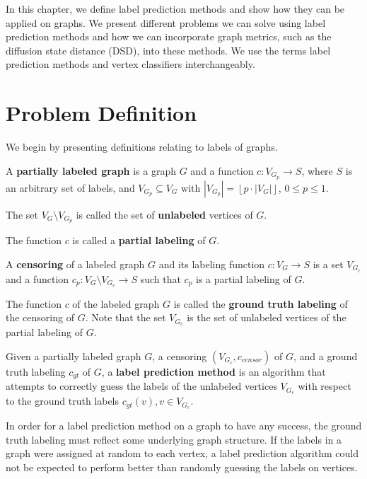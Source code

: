 In this chapter, we define label prediction methods and show how they can
be applied on graphs. We present different problems we can solve using
label prediction methods and how we can incorporate graph metrics, such as
the diffusion state distance (DSD), into these methods. We use the terms
label prediction methods and vertex classifiers interchangeably.

\section{Problem Definition}
\label{sec:label_prediction_methods}
We begin by presenting definitions relating to labels of graphs.

\begin{definition}
A \textbf{partially labeled graph} is a graph $G$ and a function
$c : V_{G_p} \to S$, where $S$ is an arbitrary set of labels, and
$V_{G_p} \subseteq V_G$ with
$|V_{G_p}| = \left\lfloor{p \cdot |V_G|}\right\rfloor$, $0 \leq p \leq 1$.

The set $V_G \setminus V_{G_p}$ is called the set of \textbf{unlabeled} 
vertices of $G$.

The function $c$ is called a \textbf{partial labeling} of $G$.
\end{definition}

\begin{definition}
A \textbf{censoring} of a labeled graph $G$ and its labeling function
$c : V_G \to S$ is a set $V_{G_c}$ and a function
$c_p: V_G \setminus V_{G_c} \to S$ such that $c_p$ is a partial labeling
of $G$.

The function $c$ of the labeled graph $G$ is called the \textbf{ground truth labeling} of the
censoring of $G$. Note that the set $V_{G_c}$ is the set of unlabeled vertices of the partial
labeling of $G$.
\end{definition}

Given a partially labeled graph $G$, a censoring $(V_{G_c}, c_{censor})$
of $G$, and a ground truth labeling $c_{gt}$ of $G$, a 
\textbf{label prediction method} is an algorithm that attempts to correctly 
guess the labels of the unlabeled vertices $V_{G_c}$ with respect to the
ground truth labels $c_{gt}(v), v \in V_{G_c}$.

In order for a label prediction method on a graph to have any success, the ground truth labeling
must reflect some underlying graph structure. If the labels in a graph were assigned at random to
each vertex, a label prediction algorithm could not be expected to perform better than randomly
guessing the labels on vertices.

